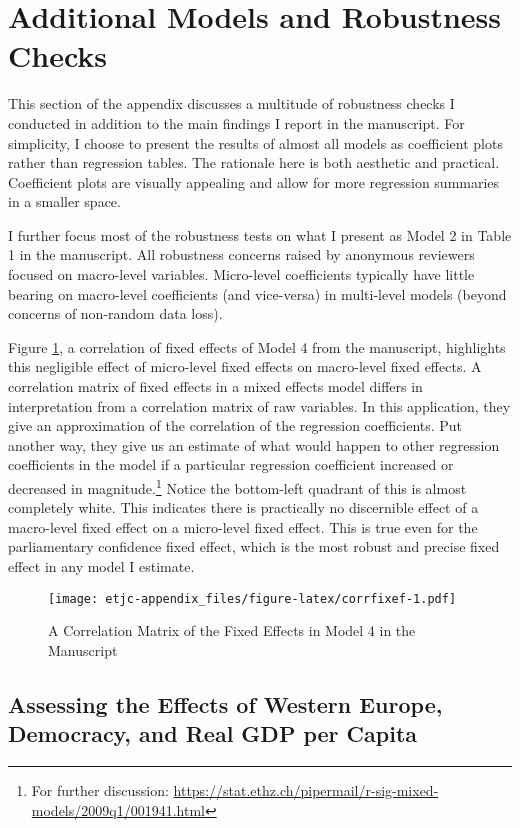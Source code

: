 \documentclass[11pt,]{article}
\makeatletter
\def\maxwidth{\ifdim\Gin@nat@width>\linewidth\linewidth
\else\Gin@nat@width\fi}
\let\Oldincludegraphics\includegraphics
\renewcommand{\includegraphics}[1]{\Oldincludegraphics[width=\maxwidth]{#1}}
\makeatother
\begin{document}
\section{Additional Models and Robustness
Checks}\label{additional-models-and-robustness-checks}

This section of the appendix discusses a multitude of robustness checks
I conducted in addition to the main findings I report in the manuscript.
For simplicity, I choose to present the results of almost all models as
coefficient plots rather than regression tables. The rationale here is
both aesthetic and practical. Coefficient plots are visually appealing
and allow for more regression summaries in a smaller space.

I further focus most of the robustness tests on what I present as Model
2 in Table 1 in the manuscript. All robustness concerns raised by
anonymous reviewers focused on macro-level variables. Micro-level
coefficients typically have little bearing on macro-level coefficients
(and vice-versa) in multi-level models (beyond concerns of non-random
data loss).

Figure \ref{fig:corrfixef}, a correlation of fixed effects of Model 4
from the manuscript, highlights this negligible effect of micro-level
fixed effects on macro-level fixed effects. A correlation matrix of
fixed effects in a mixed effects model differs in interpretation from a
correlation matrix of raw variables. In this application, they give an
approximation of the correlation of the regression coefficients. Put
another way, they give us an estimate of what would happen to other
regression coefficients in the model if a particular regression
coefficient increased or decreased in magnitude.\footnote{For further
  discussion:
  \url{https://stat.ethz.ch/pipermail/r-sig-mixed-models/2009q1/001941.html}}
Notice the bottom-left quadrant of this is almost completely white. This
indicates there is practically no discernible effect of a macro-level
fixed effect on a micro-level fixed effect. This is true even for the
parliamentary confidence fixed effect, which is the most robust and
precise fixed effect in any model I estimate.

\begin{figure}[htbp]
\centering
\texttt{[image: etjc-appendix\_files/figure-latex/corrfixef-1.pdf]}
\caption{\label{fig:corrfixef} A Correlation Matrix of the Fixed Effects
in Model 4 in the Manuscript}
\end{figure}

\subsection{Assessing the Effects of Western Europe, Democracy, and Real
GDP per
Capita}\label{assessing-the-effects-of-western-europe-democracy-and-real-gdp-per-capita}
\end{document}

